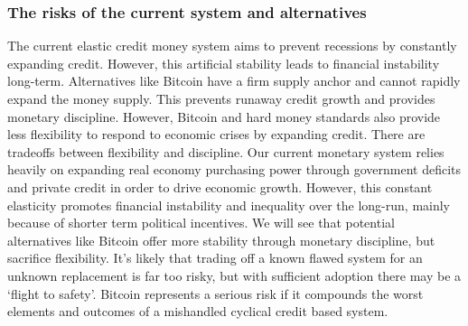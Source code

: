 \subsubsection{The risks of the current system and alternatives}
The current elastic credit money system aims to prevent recessions by constantly expanding credit. However, this artificial stability leads to financial instability long-term.
Alternatives like Bitcoin have a firm supply anchor and cannot rapidly expand the money supply. This prevents runaway credit growth and provides monetary discipline.
However, Bitcoin and hard money standards also provide less flexibility to respond to economic crises by expanding credit. There are tradeoffs between flexibility and discipline.
Our current monetary system relies heavily on expanding real economy purchasing power through government deficits and private credit in order to drive economic growth. However, this constant elasticity promotes financial instability and inequality over the long-run, mainly because of shorter term political incentives. We will see that potential alternatives like Bitcoin offer more stability through monetary discipline, but sacrifice flexibility. It's likely that trading off a known flawed system for an unknown replacement is far too risky, but with sufficient adoption there may be a `flight to safety'. Bitcoin represents a serious risk if it compounds the worst elements and outcomes of a mishandled cyclical credit based system.

